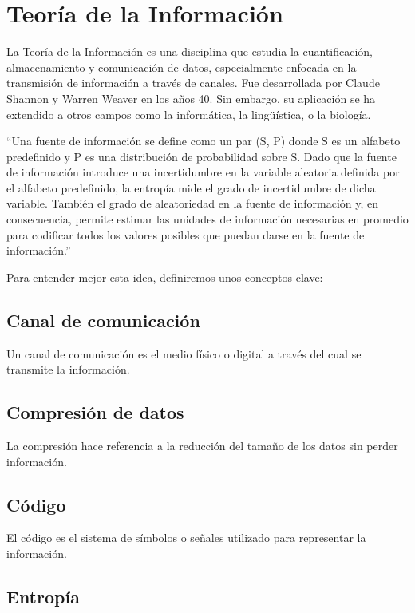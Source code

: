 \documentclass[11pt,spanish,listoffigures,listoftables]{tfgetsinf}
\begin{document}
\section{Teoría de la Información}

La Teoría de la Información es una disciplina que estudia la cuantificación, almacenamiento y comunicación de datos, especialmente enfocada en la transmisión de información a través de canales. Fue desarrollada por Claude Shannon y Warren Weaver en los años 40. Sin embargo, su aplicación se ha extendido a otros campos como la informática, la lingüística, o la biología\cite{COV}.

“Una fuente de información se define como un par (S, P) donde S es un alfabeto predefinido y P es una distribución de probabilidad sobre S. Dado que la fuente de información introduce una incertidumbre en la variable aleatoria definida por el alfabeto predefinido, la entropía mide el grado de incertidumbre de dicha variable. También el grado de aleatoriedad en la fuente de información y, en consecuencia, permite estimar las unidades de información necesarias en promedio para codificar todos los valores posibles que puedan darse en la fuente de información.”\cite[p.~3]{ROB}

Para entender mejor esta idea, definiremos unos conceptos clave:  

\subsection{Canal de comunicación }

Un canal de comunicación es el medio físico o digital a través del cual se transmite la información.  

\subsection{Compresión de datos}

La compresión hace referencia a la reducción del tamaño de los datos sin perder información.  

\subsection{Código}

El código es el sistema de símbolos o señales utilizado para representar la información. 

\subsection{Entropía} 
\end{document}
